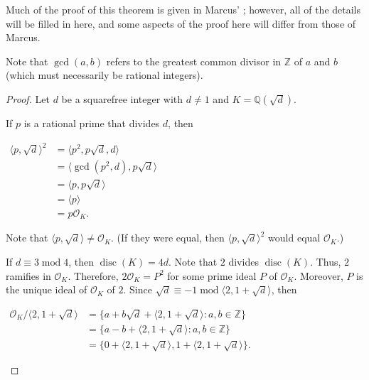\documentclass[12pt]{article}
\begin{document}

Much of the proof of this theorem is given in Marcus' ; however, all of the details will be filled in here, and some aspects of the proof here will differ from those of Marcus.

Note that $\gcd(a,b)$ refers to the greatest common divisor in $\mathbb{Z}$ of $a$ and $b$ (which must necessarily be rational integers).

\begin{proof}
Let $d$ be a squarefree integer with $d \neq 1$ and $K=\mathbb{Q}(\sqrt{d})$.

If $p$ is a rational prime that divides $d$, then

\begin{center}
$\begin{array}{ll}
\langle p, \sqrt{d} \rangle^2 & = \langle p^2, p \sqrt{d}, d \rangle \\
& = \langle \gcd(p^2,d) , p \sqrt{d} \rangle \\
& = \langle p, p \sqrt{d} \rangle \\
& = \langle p \rangle \\
& = p \mathcal{O}_K. \end{array}$
\end{center}

Note that $\langle p, \sqrt{d} \rangle \neq \mathcal{O}_K$.  (If they were equal, then $\langle p, \sqrt{d} \rangle^2$ would equal $\mathcal{O}_K$.)

If $d \equiv 3 \operatorname{mod} 4$, then $\operatorname{disc}(K)=4d$.  Note that $2$ divides $\operatorname{disc}(K)$.  Thus, $2$ ramifies in $\mathcal{O}_K$.  Therefore, $2\mathcal{O}_K=P^2$ for some prime ideal $P$ of $\mathcal{O}_K$.  Moreover, $P$ is the unique ideal of $\mathcal{O}_K$ of  $2$.  Since $\sqrt{d} \equiv -1 \operatorname{mod} \langle 2, 1+\sqrt{d} \rangle$, then

\begin{center}
$\begin{array}{ll}
\mathcal{O}_K / \langle 2, 1+\sqrt{d} \rangle & = \{a+b\sqrt{d}+\langle 2, 1+\sqrt{d} \rangle : a,b \in \mathbb{Z} \} \\
& = \{a-b+\langle 2, 1+\sqrt{d} \rangle : a,b \in \mathbb{Z} \} \\
& = \{0+\langle 2, 1+\sqrt{d} \rangle , 1+\langle 2, 1+\sqrt{d} \rangle \}. \end{array}$
\end{center}


\end{proof}
\end{document}
